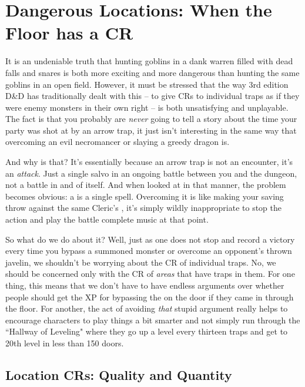 \section{Dangerous Locations: When the Floor has a CR}

It is an undeniable truth that hunting goblins in a dank warren filled with dead falls and snares is both more exciting and more dangerous than hunting the same goblins in an open field. However, it must be stressed that the way 3rd edition D\&D has traditionally dealt with this -- to give CRs to individual traps as if they were enemy monsters in their own right -- is both unsatisfying and unplayable. The fact is that you probably are \textit{never} going to tell a story about the time your party was shot at by an arrow trap, it just isn't interesting in the same way that overcoming an evil necromancer or slaying a greedy dragon is.

And why is that? It's essentially because an arrow trap is not an encounter, it's an \textit{attack}. Just a single salvo in an ongoing battle between you and the dungeon, not a battle in and of itself. And when looked at in that manner, the problem becomes obvious: a  is a single spell. Overcoming it is like making your saving throw against the same Cleric's , it's simply wildly inappropriate to stop the action and play the battle complete music at that point.

So what do we do about it? Well, just as one does not stop and record a victory every time you bypass a summoned monster or overcome an opponent's thrown javelin, we shouldn't be worrying about the CR of individual traps. No, we should be concerned only with the CR of \textit{areas} that have traps in them. For one thing, this means that we don't have to have endless arguments over whether people should get the XP for bypassing the  on the door if they came in through the floor. For another, the act of avoiding \textit{that} stupid argument really helps to encourage characters to play things a bit smarter and not simply run through the ``Hallway of Leveling" where they go up a level every thirteen traps and get to 20th level in less than 150 doors.

\subsection{Location CRs: Quality and Quantity}
\vspace*{-8pt}

